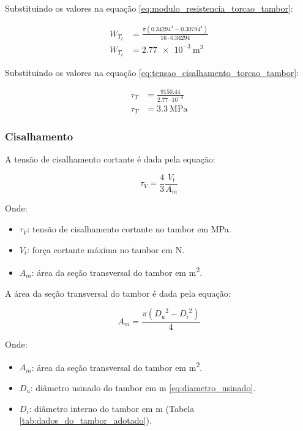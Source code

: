 Substituindo os valores na equação \eqref{eq:modulo_resistencia_torcao_tambor}:

\begin{align*}
  W_{T_t} & = \frac{\pi \left( \num{0.34294}^4 - \num{0.30794}^4 \right)}{16 \cdot \num{0.34294}} \\
  W_{T_t} & = \boxed{\SI{2.77e-3}{\meter\cubed}}
\end{align*}

Substituindo os valores na equação \eqref{eq:tensao_cisalhamento_torcao_tambor}:

\begin{align*}
  \tau_T & = \frac{\num{9150.44}}{\num{2.77} \cdot 10^{-3}} \\
  \tau_T & = \boxed{\SI{3.3}{\mega\pascal}}
\end{align*}

\subsubsection{Cisalhamento}

A tensão de cisalhamento cortante é dada pela equação:

\begin{equation}
  \tau_V = \frac{4}{3} \frac{V_t}{A_m}
  \label{eq:tensao_cisalhamento_tambor}
\end{equation}

Onde:

\begin{itemize}
  \item $\tau_V$: tensão de cisalhamento cortante no tambor em \si{\mega\pascal}.
  \item $V_t$: força cortante máxima no tambor em \si{\newton}.
  \item $A_m$: área da seção transversal do tambor em \si{\meter\squared}.
\end{itemize}

\vspace{1em}

A área da seção transversal do tambor é dada pela equação:

\begin{equation}
  A_m = \frac{\pi \left( {D_u}^2 - {D_i}^2 \right)}{4}
  \label{eq:area_secao_transversal_tambor}
\end{equation}

Onde:

\begin{itemize}
  \item $A_m$: área da seção transversal do tambor em \si{\meter\squared}.
  \item $D_u$: diâmetro usinado do tambor em \si{\meter} \eqref{eq:diametro_usinado}.
  \item $D_i$: diâmetro interno do tambor em \si{\meter} (Tabela \ref{tab:dados_do_tambor_adotado}).
\end{itemize}

